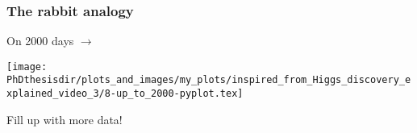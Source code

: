 \begin{frame}
\frametitle{The rabbit analogy}
\addtocounter{framenumber}{-1}
\transwipe[direction=90]
\begin{center}
\begin{minipage}[c]{.29\textwidth}
On \num{2000} days $\rightarrow$
\end{minipage}
\begin{minipage}[c]{.4\textwidth}
\vspace{-\baselineskip}
\texttt{[image: \\PhDthesisdir/plots\_and\_images/my\_plots/inspired\_from\_Higgs\_discovery\_explained\_video\_3/8-up\_to\_2000-pyplot.tex]}
\end{minipage}
\begin{minipage}[c]{.29\textwidth}
Fill up with more data!
\end{minipage}
\end{center}
\end{frame}



